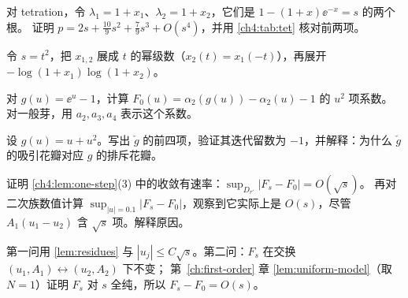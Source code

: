 \begin{exercise}\label{ch4:ex:tet-p}
对 tetration，令 $\lambda_1=1+x_1$、$\lambda_2=1+x_2$，它们是 $1-(1+x)\ee^{-x}=s$ 的两个根。
证明 $p=2s+\frac{10}9s^2+\frac79s^3+O(s^4)$，并用 \cref{ch4:tab:tet} 核对前两项。
\end{exercise}
\begin{hint}
令 $s=t^2$，把 $x_{1,2}$ 展成 $t$ 的幂级数（$x_2(t)=x_1(-t)$），再展开 $-\log(1+x_1)\log(1+x_2)$。
\end{hint}

\begin{exercise}\label{ch4:ex:F0}
对 $g(u)=\ee^u-1$，计算 $F_0(u)=\alpha_2(g(u))-\alpha_2(u)-1$ 的 $u^2$ 项系数。对一般芽，用 $a_2,a_3,a_4$ 表示这个系数。
\end{exercise}

\begin{exercise}\label{ch4:ex:reflected}
设 $g(u)=u+u^2$。写出 $\check g$ 的前四项，验证其迭代留数为 $-1$，并解释：为什么 $\check g$ 的吸引花瓣对应 $g$ 的排斥花瓣。
\end{exercise}

\begin{exercise}\label{ch4:ex:uniform-rate}
证明 \cref{ch4:lem:one-step}(3) 中的收敛有速率：$\sup_{D_{r'}}|F_s-F_0|=O(\sqrt s)$。
再对二次族数值计算 $\sup_{|u|=0.1}|F_s-F_0|$，观察到它实际上是 $O(s)$，尽管 $A_1(u_1-u_2)$ 含 $\sqrt s$ 项。解释原因。
\end{exercise}
\begin{hint}
第一问用 \cref{lem:residues} 与 $|u_j|\le C\sqrt s$。第二问：$F_s$ 在交换 $(u_1,A_1)\leftrightarrow(u_2,A_2)$ 下不变；
第~\ref{ch:first-order} 章 \cref{lem:uniform-model}（取 $N=1$）证明 $F_s$ 对 $s$ 全纯，所以 $F_s-F_0=O(s)$。
\end{hint}
